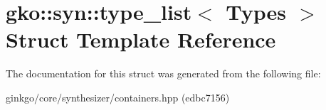 \hypertarget{structgko_1_1syn_1_1type__list}{}\section{gko\+:\+:syn\+:\+:type\+\_\+list$<$ Types $>$ Struct Template Reference}
\label{structgko_1_1syn_1_1type__list}


The documentation for this struct was generated from the following file\+:\begin{DoxyCompactItemize}
\item 
ginkgo/core/synthesizer/containers.\+hpp (edbc7156)\end{DoxyCompactItemize}
